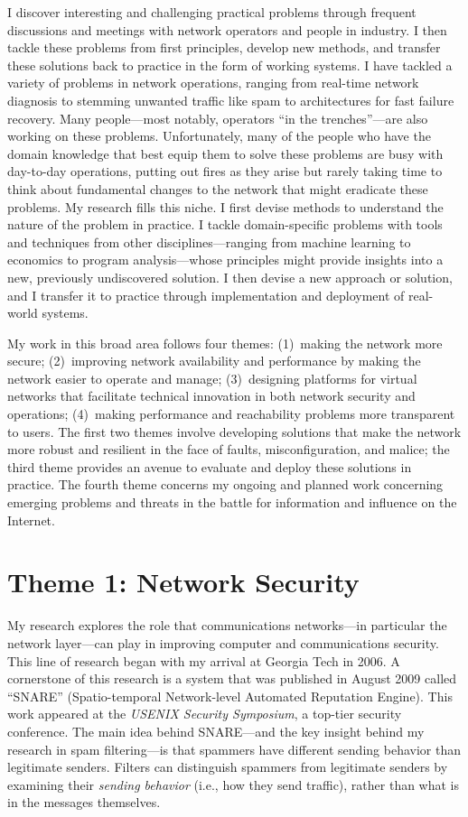 I discover interesting and challenging practical problems through
frequent discussions and meetings with network operators and people in
industry.  I then tackle these problems from first principles, develop
new methods, and transfer these solutions back to practice in the form
of working systems.  I have tackled a variety of problems in network
operations, ranging from real-time network diagnosis to stemming
unwanted traffic like spam to architectures for fast failure recovery.
Many people---most notably, operators ``in the trenches''---are also
working on these problems.  Unfortunately, many of the people who have
the domain knowledge that best equip them to solve these problems are
busy with day-to-day operations, putting out fires as they arise but
rarely taking time to think about fundamental changes to the network
that might eradicate these problems.  My research fills this niche.  I
first devise methods to understand the nature of the problem in
practice.  I tackle domain-specific problems with tools and techniques
from other disciplines---ranging from machine learning to economics to
program analysis---whose principles might provide insights into a new,
previously undiscovered solution.  I then devise a new approach or
solution, and I transfer it to practice through implementation and
deployment of real-world systems.

My work in this broad area follows four themes: (1)~making the network
more secure; (2)~improving network availability and performance by
making the network easier to operate and manage; (3)~designing platforms
for virtual networks that facilitate technical innovation in both
network security and operations; (4)~making performance and reachability
problems more transparent to users.  The first two themes involve
developing solutions that make the network more robust and resilient in
the face of faults, misconfiguration, and malice; the third theme
provides an avenue to evaluate and deploy these solutions in practice.
The fourth theme concerns my ongoing and planned work concerning
emerging problems and threats in the battle for information and
influence on the Internet.

\section*{Theme 1: Network Security}

\fp My research explores the role that communications
networks---in particular the network layer---can play in improving
computer and communications security.  This line of research began with
my arrival at Georgia Tech in 2006. A cornerstone of this
research is a system that was published in August 2009 called ``SNARE''
(Spatio-temporal Network-level Automated Reputation Engine). This work
appeared at the {\em USENIX Security Symposium}, a top-tier security
conference. The main idea behind SNARE---and the key insight behind my
research in spam filtering---is that spammers have different sending
behavior than legitimate senders.  Filters can distinguish
spammers from legitimate senders by examining their {\em sending
behavior} (i.e., how they send traffic), rather than what is in the
messages themselves.

